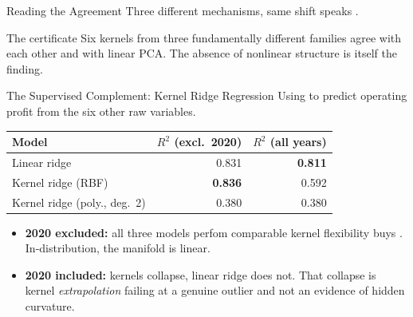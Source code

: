 \documentclass[10pt,aspectratio=169]{beamer}
\begin{document}
\begin{frame}{Reading the Agreement}
  Three different mechanisms, same shift speaks .
  \vspace{0.2cm}
  \begin{exampleblock}{The certificate}
    Six kernels from three fundamentally different families agree with each
    other and with linear PCA.  The absence of nonlinear structure is itself the finding.
  \end{exampleblock}
\end{frame}


\begin{frame}{The Supervised Complement: Kernel Ridge Regression}
  Using  to predict operating profit from the six other raw variables.
  \vspace{0.3cm}
  \begin{center}
  \small
  \begin{tabular}{@{}l r r@{}}
  \toprule
  \textbf{Model} & \textbf{$R^2$ (excl.\ 2020)} & \textbf{$R^2$ (all years)} \\
  \midrule
  Linear ridge                 & 0.831          & \textbf{0.811} \\
  Kernel ridge (RBF)           & \textbf{0.836} & 0.592 \\
  Kernel ridge (poly., deg.~2) & 0.380          & 0.380 \\
  \bottomrule
  \end{tabular}
  \end{center}
  \vspace{0.3cm}
  \begin{itemize}
    \item \textbf{2020 excluded:} all three models perfom comparable
      kernel flexibility buys . 
      In-distribution, the manifold is linear.
    \item \textbf{2020 included:} kernels collapse, linear ridge does not.
      That collapse is kernel \emph{extrapolation} failing at a
      genuine outlier and not an evidence of hidden curvature.
  \end{itemize}
\end{frame}
\end{document}
